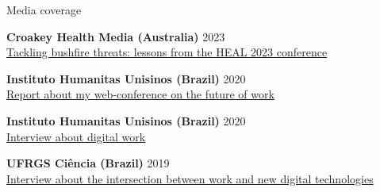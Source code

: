 \begin{rSection}{Media coverage}

{\textbf{Croakey Health Media (Australia)}} {\hfill 2023}\\
\href{https://www.croakey.org/tackling-bushfire-threats-lessons-from-the-heal-2023-conference/}{Tackling bushfire threats: lessons from the HEAL 2023 conference}\par

{\textbf{Instituto Humanitas Unisinos (Brazil)}} {\hfill 2020}\\
\href{http://www.ihu.unisinos.br/78-noticias/603222-o-trabalho-e-produto-do-humano-e-nao-o-humano-e-produto-do-trabalho}{Report about my web-conference on the future of work}\par

{\textbf{Instituto Humanitas Unisinos (Brazil)}} {\hfill 2020}\\
\href{http://www.ihu.unisinos.br/598080-a-nova-gramatica-da-divisao-do-trabalho-digital-e-os-desafios-da-plataformizacao-entrevista-especial-com-lucas-hertzog}{Interview about digital work}\par

{\textbf{UFRGS Ciência (Brazil)}} {\hfill 2019}\\
\href{https://www.ufrgs.br/ciencia/pesquisador-analisa-a-interseccao-entre-o-trabalho-e-as-novas-tecnologias-digitais-no-youtube/}{Interview about the intersection between work and new digital technologies}

\end{rSection}